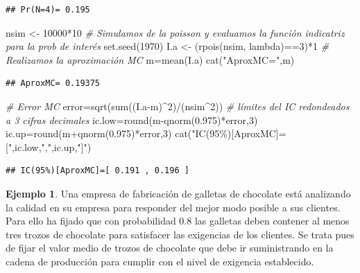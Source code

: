 \documentclass[
]{book}
\newenvironment{Shaded}{\begin{snugshade}}{\end{snugshade}}
\newcommand{\CommentTok}[1]{\textcolor[rgb]{0.56,0.35,0.01}{\textit{#1}}}
\newcommand{\DecValTok}[1]{\textcolor[rgb]{0.00,0.00,0.81}{#1}}
\newcommand{\FloatTok}[1]{\textcolor[rgb]{0.00,0.00,0.81}{#1}}
\newcommand{\FunctionTok}[1]{\textcolor[rgb]{0.00,0.00,0.00}{#1}}
\newcommand{\NormalTok}[1]{#1}
\newcommand{\OtherTok}[1]{\textcolor[rgb]{0.56,0.35,0.01}{#1}}
\newcommand{\SpecialCharTok}[1]{\textcolor[rgb]{0.00,0.00,0.00}{#1}}
\newcommand{\StringTok}[1]{\textcolor[rgb]{0.31,0.60,0.02}{#1}}
\theoremstyle{definition}
\theoremstyle{definition}
\newtheorem{example}{Ejemplo}[chapter]
\theoremstyle{definition}
\theoremstyle{definition}
\theoremstyle{remark}
\begin{document}
\begin{verbatim}
## Pr(N=4)= 0.195
\end{verbatim}

\begin{Shaded}
\begin{Highlighting}[]
\NormalTok{nsim }\OtherTok{\textless{}{-}} \DecValTok{10000}\SpecialCharTok{*}\DecValTok{10}
\CommentTok{\# Simulamos de la poisson y evaluamos la función indicatriz para la prob de interés}
\FunctionTok{set.seed}\NormalTok{(}\DecValTok{1970}\NormalTok{)}
\NormalTok{I.a }\OtherTok{\textless{}{-}}\NormalTok{ (}\FunctionTok{rpois}\NormalTok{(nsim, lambda)}\SpecialCharTok{==}\DecValTok{3}\NormalTok{)}\SpecialCharTok{*}\DecValTok{1}
\CommentTok{\# Realizamos la aproximación MC}
\NormalTok{m}\OtherTok{=}\FunctionTok{mean}\NormalTok{(I.a)}
\FunctionTok{cat}\NormalTok{(}\StringTok{"AproxMC="}\NormalTok{,m)}
\end{Highlighting}
\end{Shaded}

\begin{verbatim}
## AproxMC= 0.19375
\end{verbatim}

\begin{Shaded}
\begin{Highlighting}[]
\CommentTok{\# Error MC}
\NormalTok{error}\OtherTok{=}\FunctionTok{sqrt}\NormalTok{(}\FunctionTok{sum}\NormalTok{((I.a}\SpecialCharTok{{-}}\NormalTok{m)}\SpecialCharTok{\^{}}\DecValTok{2}\NormalTok{)}\SpecialCharTok{/}\NormalTok{(nsim}\SpecialCharTok{\^{}}\DecValTok{2}\NormalTok{))}
\CommentTok{\# límites del IC redondeados a 3 cifras decimales}
\NormalTok{ic.low}\OtherTok{=}\FunctionTok{round}\NormalTok{(m}\SpecialCharTok{{-}}\FunctionTok{qnorm}\NormalTok{(}\FloatTok{0.975}\NormalTok{)}\SpecialCharTok{*}\NormalTok{error,}\DecValTok{3}\NormalTok{)}
\NormalTok{ic.up}\OtherTok{=}\FunctionTok{round}\NormalTok{(m}\SpecialCharTok{+}\FunctionTok{qnorm}\NormalTok{(}\FloatTok{0.975}\NormalTok{)}\SpecialCharTok{*}\NormalTok{error,}\DecValTok{3}\NormalTok{)}
\FunctionTok{cat}\NormalTok{(}\StringTok{"IC(95\%)[AproxMC]=["}\NormalTok{,ic.low,}\StringTok{","}\NormalTok{,ic.up,}\StringTok{"]"}\NormalTok{)}
\end{Highlighting}
\end{Shaded}

\begin{verbatim}
## IC(95%)[AproxMC]=[ 0.191 , 0.196 ]
\end{verbatim}

\begin{example}
\protect\hypertarget{exm:poisson02}{}\label{exm:poisson02}Una empresa de fabricación de galletas de chocolate está analizando la calidad en su empresa para responder del mejor modo posible a sus clientes. Para ello ha fijado que con probabilidad 0.8 las galletas deben contener al menos tres trozos de chocolate para satisfacer las exigencias de los clientes. Se trata pues de fijar el valor medio de trozos de chocolate que debe ir suministrando en la cadena de producción para cumplir con el nivel de exigencia establecido.
\end{example}
\end{document}
